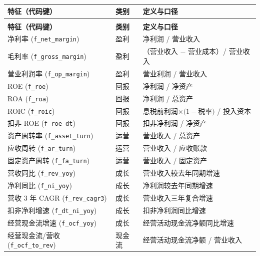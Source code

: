 \documentclass[UTF8, a4paper, fontset=none, zihao=-4]{ctexrep}
\begin{document}
\footnotesize
\renewcommand{\arraystretch}{1.3}
\begin{longtable}{@{}>{\raggedright\arraybackslash}p{3.9cm}>{\raggedright\arraybackslash}p{2.0cm}>{\raggedright\arraybackslash}p{8.5cm}@{}}
\toprule
\textbf{\color{brandblue}特征（代码键）} & \textbf{\color{brandblue}类别} & \textbf{\color{brandblue}定义与口径} \\
\midrule
\endfirsthead
\multicolumn{3}{@{}l}{\footnotesize（续表~\ref{app:datadict}）}\\
\toprule
\textbf{\color{brandblue}特征（代码键）} & \textbf{\color{brandblue}类别} & \textbf{\color{brandblue}定义与口径} \\
\midrule
\endhead
\bottomrule
\endfoot
净利率 (\texttt{\scriptsize f\_net\_margin}) & 盈利 & 净利润 / 营业收入 \\
毛利率 (\texttt{\scriptsize f\_gross\_margin}) & 盈利 & （营业收入 $-$ 营业成本）/ 营业收入 \\
营业利润率 (\texttt{\scriptsize f\_op\_margin}) & 盈利 & 营业利润 / 营业收入 \\
ROE (\texttt{\scriptsize f\_roe}) & 回报 & 净利润 / 净资产 \\
ROA (\texttt{\scriptsize f\_roa}) & 回报 & 净利润 / 总资产 \\
ROIC (\texttt{\scriptsize f\_roic}) & 回报 & 息税前利润$\times(1-$税率$)$ / 投入资本 \\
扣非 ROE (\texttt{\scriptsize f\_roe\_dt}) & 回报 & 扣非净利润 / 净资产 \\
资产周转率 (\texttt{\scriptsize f\_asset\_turn}) & 运营 & 营业收入 / 总资产 \\
应收周转 (\texttt{\scriptsize f\_ar\_turn}) & 运营 & 营业收入 / 应收账款 \\
固定资产周转 (\texttt{\scriptsize f\_fa\_turn}) & 运营 & 营业收入 / 固定资产 \\
营收同比 (\texttt{\scriptsize f\_rev\_yoy}) & 成长 & 营业收入较去年同期增速 \\
净利同比 (\texttt{\scriptsize f\_ni\_yoy}) & 成长 & 净利润较去年同期增速 \\
营收 3 年 CAGR (\texttt{\scriptsize f\_rev\_cagr3}) & 成长 & 营业收入三年复合增速 \\
扣非净利增速 (\texttt{\scriptsize f\_dt\_ni\_yoy}) & 成长 & 扣非净利润同比增速 \\
经营现金流增速 (\texttt{\scriptsize f\_ocf\_yoy}) & 成长 & 经营活动现金流净额同比增速 \\
经营现金流/营收 (\texttt{\scriptsize f\_ocf\_to\_rev}) & 现金流 & 经营活动现金流净额 / 营业收入 \\

\end{longtable}
\end{document}
